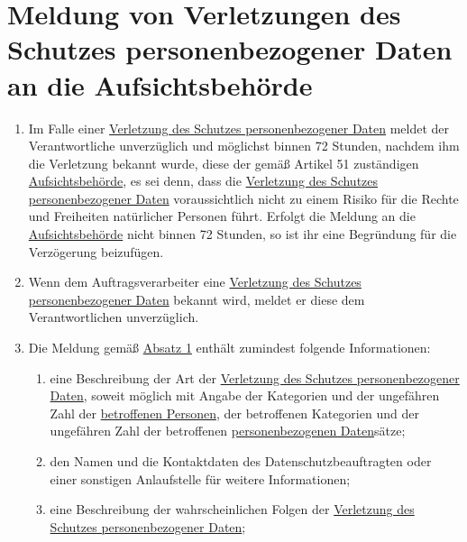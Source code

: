 \chapter{Meldung von Verletzungen des Schutzes personenbezogener Daten an die Aufsichtsbehörde}
\label{ch:33}


\begin{enumerate}

  \item Im Falle einer \hyperref[itm:04-12]{Verletzung des Schutzes personenbezogener Daten} meldet der Verantwortliche unverzüglich und
   möglichst binnen 72 Stunden, nachdem ihm die Verletzung bekannt wurde, diese der gemäß Artikel 51 zuständigen
   \hyperref[itm:04-21]{Aufsichtsbehörde}, es sei denn, dass die \hyperref[itm:04-12]{Verletzung des Schutzes personenbezogener Daten} voraussichtlich nicht zu
   einem Risiko für die Rechte und Freiheiten natürlicher Personen führt. Erfolgt die Meldung an die \hyperref[itm:04-21]{Aufsichtsbehörde}
   nicht binnen 72 Stunden, so ist ihr eine Begründung für die Verzögerung beizufügen.
  \label{itm:33-1}

  \item Wenn dem Auftragsverarbeiter eine \hyperref[itm:04-12]{Verletzung des Schutzes personenbezogener Daten} bekannt wird, meldet er diese
   dem Verantwortlichen unverzüglich.
  \label{itm:33-2}

  \item Die Meldung gemäß \hyperref[itm:33-1]{Absatz 1} enthält zumindest folgende Informationen:
  \label{itm:33-3}

  \begin{enumerate}
  
    \item eine Beschreibung der Art der \hyperref[itm:04-12]{Verletzung des Schutzes personenbezogener Daten}, soweit möglich mit Angabe der
     Kategorien und der ungefähren Zahl der \hyperref[itm:04-1]{betroffenen Personen}, der betroffenen Kategorien und der ungefähren Zahl
     der betroffenen \hyperref[itm:04-1]{personenbezogenen Daten}sätze;
    \label{itm:33-3a}

    \item den Namen und die Kontaktdaten des Datenschutzbeauftragten oder einer sonstigen Anlaufstelle für weitere
     Informationen;
    \label{itm:33-3b}

    \item eine Beschreibung der wahrscheinlichen Folgen der \hyperref[itm:04-12]{Verletzung des Schutzes personenbezogener Daten};
    \label{itm:33-3c}


\end{enumerate}
\end{enumerate}
